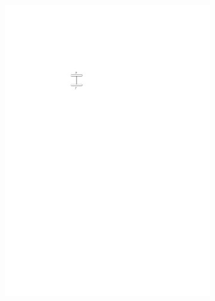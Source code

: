 \begin{description}
\begin{itemize}
\begin{figure}[H]
\begin{subfigure}{0.8\linewidth}
		\includegraphics[width=\textwidth,page=6]{drawings/2-trees.pdf}
		\caption{}
	\end{subfigure}
	\begin{subfigure}{0.8\linewidth}
		\centering

\end{subfigure}
\end{figure}
\end{itemize}
\end{description}

